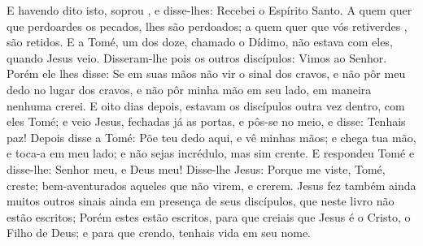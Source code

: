 {  E havendo dito isto, soprou
{}, e disse-lhes: Recebei o Espírito Santo.
  A quem quer que perdoardes os pecados, lhes são perdoados;
{} a quem quer que vós retiverdes
{}, {} são retidos.
  E a Tomé, um dos doze, chamado o Dídimo, não estava com eles, quando Jesus veio.
  Disseram-lhe pois os outros discípulos: Vimos ao Senhor. Porém ele lhes disse: Se em suas mãos não vir o sinal dos cravos, e não pôr meu dedo no lugar dos cravos, e não pôr minha mão em seu lado, em maneira nenhuma crerei.
  E oito dias depois, estavam os discípulos outra vez dentro,
{} com eles Tomé; e veio Jesus, fechadas já as portas, e pôs-se no meio, e disse: Tenhais paz!
  Depois disse a Tomé: Põe teu dedo aqui, e vê minhas mãos; e chega tua mão, e toca-a em meu lado; e não sejas incrédulo, mas sim crente.
  E respondeu Tomé e disse-lhe: Senhor meu, e Deus meu!
  Disse-lhe Jesus: Porque me viste, Tomé, creste; bem-aventurados aqueles que não virem, e crerem.
  Jesus fez também ainda muitos outros sinais ainda em presença de seus discípulos, que neste livro não estão escritos;
  Porém estes estão escritos, para que creiais que Jesus é o Cristo, o Filho de Deus; e para que crendo, tenhais vida em seu nome.
\par }

